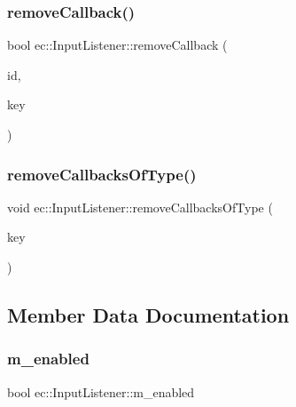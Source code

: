 \subsubsection{\texorpdfstring{remove\+Callback()}{removeCallback()}}
{\footnotesize\ttfamily bool ec\+::\+Input\+Listener\+::remove\+Callback (\begin{DoxyParamCaption}\item[{const std\+::string \&}]{id,  }\item[{\mbox{\hyperlink{namespaceec_a5de6bdb8c4b2ed6e590e721ec998f964}{Event\+Key\+\_\+T}}}]{key }\end{DoxyParamCaption})}

\mbox{\label{classec_1_1_input_listener_a3962c262607b3fc5ad1570c0c0f3a5c9}} 
\subsubsection{\texorpdfstring{remove\+Callbacks\+Of\+Type()}{removeCallbacksOfType()}}
{\footnotesize\ttfamily void ec\+::\+Input\+Listener\+::remove\+Callbacks\+Of\+Type (\begin{DoxyParamCaption}\item[{\mbox{\hyperlink{namespaceec_a5de6bdb8c4b2ed6e590e721ec998f964}{Event\+Key\+\_\+T}}}]{key }\end{DoxyParamCaption})}



\subsection{Member Data Documentation}
\mbox{\label{classec_1_1_input_listener_af36b5fc46ed59886d73b1613aaef5a47}} 
\subsubsection{\texorpdfstring{m\+\_\+enabled}{m\_enabled}}
{\footnotesize\ttfamily bool ec\+::\+Input\+Listener\+::m\+\_\+enabled\hspace{0.3cm}{\ttfamily [protected]}}

